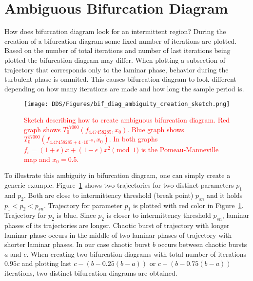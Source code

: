 \section{Ambiguous Bifurcation Diagram}
\label{sec:ambiguous_bif_diag}
How does bifurcation diagram look for an intermittent region?
During the creation of a bifurcation diagram some fixed number of iterations are plotted.
Based on the number of total iterations and number of last iterations being plotted the bifurcation diagram may differ.
When plotting a subsection of trajectory that corresponds only to the laminar phase, behavior during the turbulent phase is ommited.
This causes bifurcation diagram to look different depending on how many iterations are made and how long the sample period is.
\par
\begin{figure}[!h]
    \centering
    \texttt{[image: DDS/Figures/bif\_diag\_ambiguity\_creation\_sketch.png]}
    \caption{
        \textcolor{red}{
        Sketch describing how to create ambiguous bifurcation diagram. 
        Red graph shows $T^{17000}_{0}(f_{4.47458285}, x_0)$. 
        Blue graph shows $T^{17000}_{0}(f_{4.47458285+4 \cdot 10^{-8}}, x_0)$. 
        In both graphs $f_{\epsilon} = (1+\epsilon)x+(1-\epsilon)x^2 \pmod{1}$ is the Pomeau-Manneville map and $x_0 = 0.5$.
        }
    }
    \label{fig:ambiguous_bif_diag}
\end{figure}

To illustrate this ambiguity in bifurcation diagram, one can simply create a generic example.
Figure~\ref{fig:ambiguous_bif_diag} shows two trajectories for two distinct parameters $p_1$ and $p_2$.
Both are close to intermittency threshold (break point) $p_{sn}$ and it holds $p_1 < p_2 < p_{sn}$.
Trajectory for parameter $p_1$ is plotted with red color in Figure~\ref{fig:ambiguous_bif_diag}.
Trajectory for $p_2$ is blue.
Since $p_2$ is closer to intermittency threshold $p_{sn}$, laminar phases of its trajectories are longer.
Chaotic burst of trajectory with longer laminar phase occurs in the middle of two laminar phases of trajectory with shorter laminar phases.
In our case chaotic burst $b$ occurs between chaotic bursts $a$ and $c$.
When creating two bifurcation diagrams with total number of iterations $0.95 c$ and plotting last $c-(b-0.25(b-a))$ or $c-(b-0.75(b-a))$ iterations, two distinct bifurcation diagrams are obtained.

